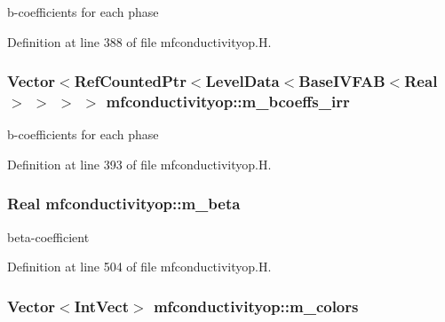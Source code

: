 b-\/coefficients for each phase 



Definition at line 388 of file mfconductivityop.\+H.

\subsubsection[{\texorpdfstring{m\+\_\+bcoeffs\+\_\+irr}{m_bcoeffs_irr}}]{\setlength{\rightskip}{0pt plus 5cm}Vector$<$Ref\+Counted\+Ptr$<$Level\+Data$<$Base\+I\+V\+F\+AB$<$Real$>$ $>$ $>$ $>$ mfconductivityop\+::m\+\_\+bcoeffs\+\_\+irr\hspace{0.3cm}{\ttfamily [protected]}}\hypertarget{classmfconductivityop_a136b2438150c02674ca31583b60345e8}{}\label{classmfconductivityop_a136b2438150c02674ca31583b60345e8}


b-\/coefficients for each phase 



Definition at line 393 of file mfconductivityop.\+H.

\subsubsection[{\texorpdfstring{m\+\_\+beta}{m_beta}}]{\setlength{\rightskip}{0pt plus 5cm}Real mfconductivityop\+::m\+\_\+beta\hspace{0.3cm}{\ttfamily [protected]}}\hypertarget{classmfconductivityop_a88f6df6137157fe0bff4ac674ab1c2d5}{}\label{classmfconductivityop_a88f6df6137157fe0bff4ac674ab1c2d5}


beta-\/coefficient 



Definition at line 504 of file mfconductivityop.\+H.

\subsubsection[{\texorpdfstring{m\+\_\+colors}{m_colors}}]{\setlength{\rightskip}{0pt plus 5cm}Vector$<$Int\+Vect$>$ mfconductivityop\+::m\+\_\+colors\hspace{0.3cm}{\ttfamily [protected]}}\hypertarget{classmfconductivityop_aff705c53e9c783326ce713f05006e558}{}\label{classmfconductivityop_aff705c53e9c783326ce713f05006e558}


